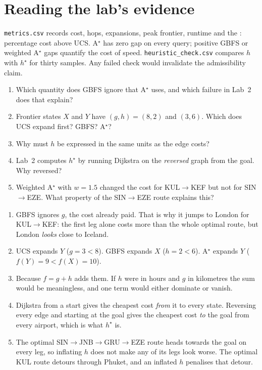 \section{Reading the lab's evidence}

\texttt{metrics.csv} records cost, hops, expansions, peak frontier, runtime and the : percentage cost above UCS. A$^\star$ has zero gap on every query; positive GBFS or weighted A$^\star$ gaps quantify the cost of speed. \texttt{heuristic\_check.csv} compares $h$ with $h^\star$ for thirty samples. Any failed check would invalidate the admissibility claim.



\begin{quickcheck}
\begin{enumerate}
  \item Which quantity does GBFS ignore that A$^\star$ uses, and which failure in Lab~2 does that explain?
  \item Frontier states $X$ and $Y$ have $(g,h)=(8,2)$ and $(3,6)$. Which does UCS expand first? GBFS? A$^\star$?
  \item Why must $h$ be expressed in the same units as the edge costs?
  \item Lab~2 computes $h^\star$ by running Dijkstra on the \emph{reversed} graph from the goal. Why reversed?
  \item Weighted A$^\star$ with $w=1.5$ changed the cost for KUL$\to$KEF but not for SIN$\to$EZE. What property of the SIN$\to$EZE route explains this?
\end{enumerate}
\end{quickcheck}

\begin{checkanswers}
\begin{enumerate}
  \item GBFS ignores $g$, the cost already paid. That is why it jumps to London for KUL$\to$KEF: the first leg alone costs more than the whole optimal route, but London \emph{looks} close to Iceland.
  \item UCS expands $Y$ ($g=3<8$). GBFS expands $X$ ($h=2<6$). A$^\star$ expands $Y$ ($f(Y)=9<f(X)=10$).
  \item Because $f=g+h$ adds them. If $h$ were in hours and $g$ in kilometres the sum would be meaningless, and one term would either dominate or vanish.
  \item Dijkstra from a start gives the cheapest cost \emph{from} it to every state. Reversing every edge and starting at the goal gives the cheapest cost \emph{to} the goal from every airport, which is what $h^\star$ is.
  \item The optimal SIN$\to$JNB$\to$GRU$\to$EZE route heads towards the goal on every leg, so inflating $h$ does not make any of its legs look worse. The optimal KUL route detours through Phuket, and an inflated $h$ penalises that detour.
\end{enumerate}
\end{checkanswers}
